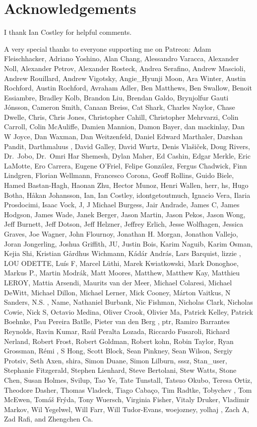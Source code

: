 \documentclass[
  letterpaper,
  DIV=11,
  numbers=noendperiod]{scrartcl}
\begin{document}
\hypertarget{acknowledgements}{%
\section*{Acknowledgements}\label{acknowledgements}}

I thank Ian Costley for helpful comments.

A very special thanks to everyone supporting me on Patreon: Adam
Fleischhacker, Adriano Yoshino, Alan Chang, Alessandro Varacca,
Alexander Noll, Alexander Petrov, Alexander Rosteck, Andrea Serafino,
Andrew Mascioli, Andrew Rouillard, Andrew Vigotsky, Angie\_Hyunji Moon,
Ara Winter, Austin Rochford, Austin Rochford, Avraham Adler, Ben
Matthews, Ben Swallow, Benoit Essiambre, Bradley Kolb, Brandon Liu,
Brendan Galdo, Brynjolfur Gauti Jónsson, Cameron Smith, Canaan Breiss,
Cat Shark, Charles Naylor, Chase Dwelle, Chris, Chris Jones, Christopher
Cahill, Christopher Mehrvarzi, Colin Carroll, Colin McAuliffe, Damien
Mannion, Damon Bayer, dan mackinlay, Dan W Joyce, Dan Waxman, Dan
Weitzenfeld, Daniel Edward Marthaler, Darshan Pandit, Darthmaluus ,
David Galley, David Wurtz, Denis Vlašiček, Doug Rivers, Dr.~Jobo,
Dr.~Omri Har Shemesh, Dylan Maher, Ed Cashin, Edgar Merkle, Eric
LaMotte, Ero Carrera, Eugene O'Friel, Felipe González, Fergus Chadwick,
Finn Lindgren, Florian Wellmann, Francesco Corona, Geoff Rollins, Guido
Biele, Hamed Bastan-Hagh, Haonan Zhu, Hector Munoz, Henri Wallen, herr,
hs, Hugo Botha, Håkan Johansson, Ian, Ian Costley, idontgetoutmuch,
Ignacio Vera, Ilaria Prosdocimi, Isaac Vock, J, J Michael Burgess, Jair
Andrade, James C, James Hodgson, James Wade, Janek Berger, Jason Martin,
Jason Pekos, Jason Wong, Jeff Burnett, Jeff Dotson, Jeff Helzner,
Jeffrey Erlich, Jesse Wolfhagen, Jessica Graves, Joe Wagner, John
Flournoy, Jonathan H. Morgan, Jonathon Vallejo, Joran Jongerling, Joshua
Griffith, JU, Justin Bois, Karim Naguib, Karim Osman, Kejia Shi,
Kristian Gårdhus Wichmann, Kádár András, Lars Barquist, lizzie , LOU
ODETTE, Luís F, Marcel Lüthi, Marek Kwiatkowski, Mark Donoghoe, Markus
P., Martin Modrák, Matt Moores, Matthew, Matthew Kay, Matthieu LEROY,
Mattia Arsendi, Maurits van der Meer, Michael Colaresi, Michael DeWitt,
Michael Dillon, Michael Lerner, Mick Cooney, Márton Vaitkus, N Sanders,
N.S. , Name, Nathaniel Burbank, Nic Fishman, Nicholas Clark, Nicholas
Cowie, Nick S, Octavio Medina, Oliver Crook, Olivier Ma, Patrick Kelley,
Patrick Boehnke, Pau Pereira Batlle, Pieter van den Berg , ptr, Ramiro
Barrantes Reynolds, Ravin Kumar, Raúl Peralta Lozada, Riccardo Fusaroli,
Richard Nerland, Robert Frost, Robert Goldman, Robert kohn, Robin
Taylor, Ryan Grossman, Rémi , S Hong, Scott Block, Sean Pinkney, Sean
Wilson, Sergiy Protsiv, Seth Axen, shira, Simon Duane, Simon Lilburn,
sssz, Stan\_user, Stephanie Fitzgerald, Stephen Lienhard, Steve
Bertolani, Stew Watts, Stone Chen, Susan Holmes, Svilup, Tao Ye, Tate
Tunstall, Tatsuo Okubo, Teresa Ortiz, Theodore Dasher, Thomas Vladeck,
Tiago Cabaço, Tim Radtke, Tobychev , Tom McEwen, Tomáš Frýda, Tony
Wuersch, Virginia Fisher, Vitaly Druker, Vladimir Markov, Wil Yegelwel,
Will Farr, Will Tudor-Evans, woejozney, yolhaj , Zach A, Zad Rafi, and
Zhengchen Ca.
\end{document}
